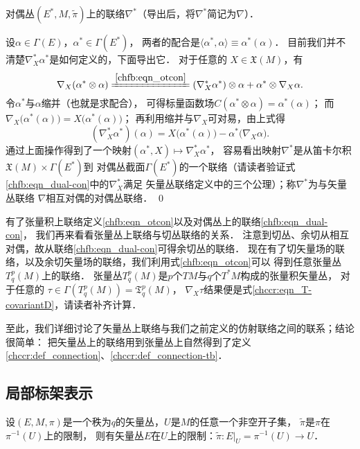 \begin{example}
    对偶丛$(E^*,M,\tilde{\pi})$上的联络$\nabla^*$（导出后，将$\nabla^*$简记为$\nabla$）．
\end{example}
设$\alpha \in \Gamma(E)$，$\alpha^*\in \Gamma(E^*)$，
两者的配合是$\langle \alpha^*, \alpha \rangle \equiv \alpha^*(\alpha)$．
目前我们并不清楚$\nabla_X^* \alpha^*$是如何定义的，下面导出它．
对于任意的 $X \in \mathfrak{X}(M)$，有
\begin{equation*}
    \nabla_X( \alpha^* \otimes \alpha )\xlongequal{\ref{chfb:eqn_otcon}}
    (\nabla_X^* \alpha^*)\otimes \alpha + \alpha^* \otimes \nabla_X \alpha .
\end{equation*}
令$\alpha^*$与$\alpha$缩并（也就是求配合），
可得标量函数场$C(\alpha^* \otimes \alpha)=\alpha^*(\alpha)$；
而$\nabla_X\bigl( \alpha^*(\alpha) \bigr)=X \bigl( \alpha^*(\alpha) \bigr)$；
再利用缩并与$\nabla_X$可对易，由上式得
\begin{equation}\label{chfb:eqn_dual-con}
    (\nabla_X^* \alpha^* )(\alpha)=X\bigl(\alpha^*(\alpha)\bigr)-\alpha^*\bigl(\nabla_X \alpha\bigr).
\end{equation}
通过上面操作得到了一个映射$(\alpha^*, X) \mapsto \nabla_X^* \alpha^*$，
容易看出映射$\nabla^*$是从笛卡尔积$\mathfrak{X}(M)\times \Gamma(E^*)$到
对偶丛截面$\Gamma (E^*)$的一个联络（请读者验证式\eqref{chfb:eqn_dual-con}中的$\nabla_X^*$满足
矢量丛联络定义中的三个公理）；称$\nabla^*$为与矢量丛联络 $\nabla$相互对偶的对偶丛联络．
\qed


有了张量积上联络定义\eqref{chfb:eqn_otcon}以及对偶丛上的联络\eqref{chfb:eqn_dual-con}，
我们再来看看张量丛上联络与切丛联络的关系．
注意到切丛、余切从相互对偶，故从联络\eqref{chfb:eqn_dual-con}可得余切丛的联络．
现在有了切矢量场的联络，以及余切矢量场的联络，我们利用式\eqref{chfb:eqn_otcon}可以
得到任意张量丛 $T_q^p(M)$上的联络．
张量丛$T_q^p(M)$是$p$个$TM$与$q$个$T^* M$构成的张量积矢量丛，
对于任意的 $\tau \in \Gamma (T_q^p(M)) =\mathfrak{T}_q^p(M)$，
$\nabla_X \tau$结果便是式\eqref{chccr:eqn_T-covariantD}，请读者补齐计算．


至此，我们详细讨论了矢量丛上联络与我们之前定义的仿射联络之间的联系；结论很简单：
把矢量丛上的联络用到张量丛上自然得到了定义\ref{chccr:def_connection}、\ref{chccr:def_connection-tb}．


\subsection{局部标架表示}

设$(E,M,\pi)$是一个秩为$q$的矢量丛，$U$是$M$的任意一个非空开子集，
$\tilde{\pi}$是$\pi$在 $\pi^{-1}(U)$上的限制，
则有矢量丛$E$在$U$上的限制：$\tilde{\pi}:\left.E\right|_U=\pi^{-1}(U) \to U$．

